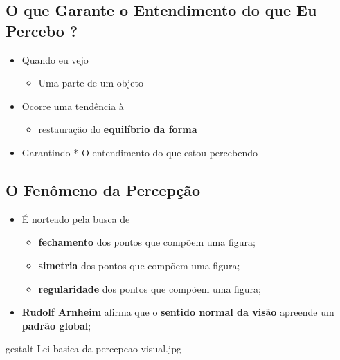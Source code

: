 \documentclass[
]{book}
\providecommand{\tightlist}{%
  \setlength{\itemsep}{0pt}\setlength{\parskip}{0pt}}
\begin{document}
\hypertarget{o-que-garante-o-entendimento-do-que-eu-percebo}{%
\subsection{O que Garante o Entendimento do que Eu Percebo ?}\label{o-que-garante-o-entendimento-do-que-eu-percebo}}

\begin{itemize}
\tightlist
\item
  Quando eu vejo

  \begin{itemize}
  \tightlist
  \item
    Uma parte de um objeto
  \end{itemize}
\item
  Ocorre uma tendência à

  \begin{itemize}
  \tightlist
  \item
    restauração do \textbf{equilíbrio da forma}
  \end{itemize}
\item
  Garantindo
  * O entendimento do que estou percebendo
\end{itemize}

\hypertarget{o-fenuxf4meno-da-percepuxe7uxe3o}{%
\subsection{O Fenômeno da Percepção}\label{o-fenuxf4meno-da-percepuxe7uxe3o}}

\begin{itemize}
\tightlist
\item
  É norteado pela busca de

  \begin{itemize}
  \tightlist
  \item
    \textbf{fechamento} dos pontos que compõem uma figura;
  \item
    \textbf{simetria} dos pontos que compõem uma figura;
  \item
    \textbf{regularidade} dos pontos que compõem uma figura;
  \end{itemize}
\item
  \textbf{Rudolf Arnheim} afirma que o \textbf{sentido normal da visão} apreende um \textbf{padrão global};
\end{itemize}

gestalt-Lei-basica-da-percepcao-visual.jpg
\end{document}
